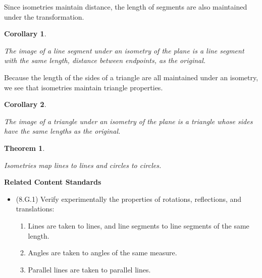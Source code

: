 \documentclass[
]{book}
\providecommand{\tightlist}{%
  \setlength{\itemsep}{0pt}\setlength{\parskip}{0pt}}
\newenvironment{standards}{}{}
\newtheorem{theorem}{Theorem}[chapter]
\newtheorem{corollary}{Corollary}[chapter]
\theoremstyle{definition}
\theoremstyle{definition}
\theoremstyle{definition}
\theoremstyle{definition}
\theoremstyle{remark}
\begin{document}
Since isometries maintain distance, the length of segments are also maintained under the transformation.

\begin{corollary}
\protect\hypertarget{cor:unlabeled-div-250}{}\label{cor:unlabeled-div-250}

The image of a line segment under an isometry of the plane is a line segment with the same length, distance between endpoints, as the original.

\end{corollary}

Because the length of the sides of a triangle are all maintained under an isometry, we see that isometries maintain triangle properties.

\begin{corollary}
\protect\hypertarget{cor:unlabeled-div-251}{}\label{cor:unlabeled-div-251}

The image of a triangle under an isometry of the plane is a triangle whose sides have the same lengths as the original.

\end{corollary}

\begin{theorem}
\protect\hypertarget{thm:unlabeled-div-252}{}\label{thm:unlabeled-div-252}

Isometries map lines to lines and circles to circles.

\end{theorem}

\begin{standards}

\begin{center}
\textbf{Related Content Standards}

\end{center}

\begin{itemize}
\item
  (8.G.1) Verify experimentally the properties of rotations, reflections, and translations:

  \begin{enumerate}
  \def\labelenumi{\alph{enumi}.}
  \tightlist
  \item
    Lines are taken to lines, and line segments to line segments of the same length.
  \item
    Angles are taken to angles of the same measure.
  \item
    Parallel lines are taken to parallel lines.
  \end{enumerate}
\end{itemize}

\end{standards}
\end{document}
